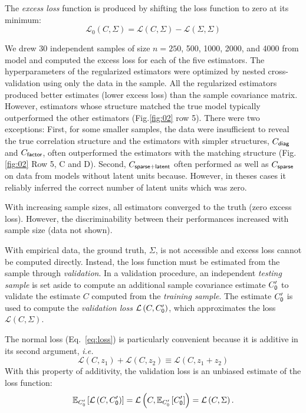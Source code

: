 \documentclass[10pt]{article}
\newcommand{\figref}[2]{Fig.\;\ref{fig:#1}\,#2}
\newcommand{\loss}[1]{\mathcal L\left(#1\right)}
\newcommand{\eloss}[1]{\mathcal L_0\left(#1\right)}
\newcommand{\E}[2][]{\mathbb E_{#1}\left[ #2\right]}    %
\newcommand{\ie}{\emph{i.e.}\;}
\begin{document}
The \emph{excess loss} function is produced by shifting the loss function to zero at its minimum:
\begin{equation}\label{eq:excess-loss}
    \eloss{C,\Sigma} = \loss{C,\Sigma}-\loss{\Sigma,\Sigma}
\end{equation}

We drew 30 independent samples of size $n=250$, 500, 1000, 2000, and 4000 from model and computed the excess loss for each of the five estimators.  The hyperparameters of the regularized estimators were optimized by nested cross-validation using only the data in the sample.  All the regularized estimators produced better estimates (lower excess loss) than the sample covariance matrix.  However, estimators whose structure matched the true model typically outperformed the other estimators (\figref{02}{\,row 5}).  There were two exceptions: First, for some smaller samples, the data were insufficient to reveal the true correlation structure and the estimators with simpler structures, $C_{\sf diag}$ and $C_{\sf factor}$, often outperformed the estimators with the matching structure (\figref{02}{\,Row 5, C and D}).  Second, $C_{\sf sparse+latent}$ often performed as well as $C_{\sf sparse}$ on data from models without latent units because.  However, in theses cases it reliably inferred the correct number of latent units which was zero.  

With increasing sample sizes, all estimators converged to the truth (zero excess loss).  However, 
the discriminability between their performances increased with sample size (data not shown).

With empirical data, the ground truth, $\Sigma$, is not accessible and excess loss cannot be computed directly. Instead, the loss function must be estimated from the sample through \emph{validation}.  In a validation procedure, an independent \emph{testing sample} is set aside to compute an additional sample covariance estimate $C_{\sf 0}^\prime$ to validate the estimate $C$ computed from the  \emph{training sample}.   The estimate $C_{\sf 0}^\prime$ is used to 
compute the \emph{validation loss} $\loss{C,C_{\sf 0}^\prime}$, which approximates the loss  $\loss{C,\Sigma}$.

The normal loss (Eq.~\ref{eq:loss}) is particularly convenient because it is additive in its second argument, \ie
 \begin{equation*}\label{eq:additivity}
 \loss{C,z_1} + \loss{C,z_2} \equiv \loss{C,z_1+z_2}
 \end{equation*}
With this property of additivity, the validation loss is an unbiased estimate of the loss function:
\begin{equation*}
    \E[C_{\sf 0}^\prime]{\loss{C,C_{\sf 0}^\prime}}=\loss{C,\E[C_{\sf 0}^\prime]{C_{\sf 0}^\prime}}=\loss{C,\Sigma}.
\end{equation*}
\end{document}
